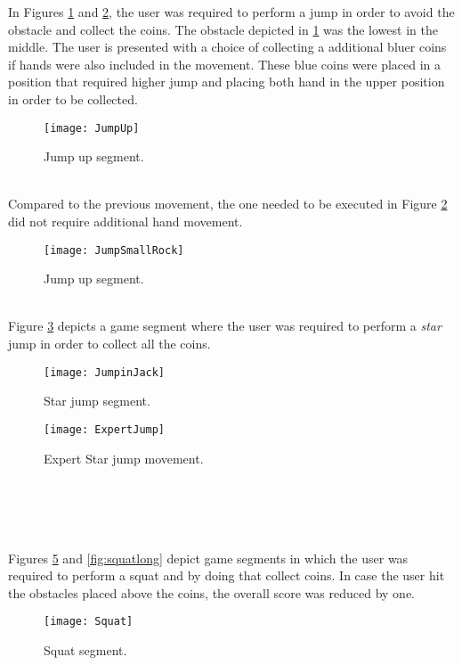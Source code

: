 In Figures \ref{fig:jumpup} and \ref{fig:jumpssmallrock}, the user was required to perform a jump in order to avoid the obstacle and collect the coins. The obstacle depicted  in \ref{fig:jumpup} was the lowest in the middle. The user is presented with a choice of collecting a additional bluer coins if hands were also included in the movement. These blue coins were placed in a position that required higher jump and placing both hand in the upper position in order to be collected.\\
\begin{figure}[h]
    \centering
    \texttt{[image: JumpUp]}
    \caption{Jump up segment.}
    \label{fig:jumpup}
\end{figure}\\
Compared to the previous movement, the one needed to be executed in Figure \ref{fig:jumpssmallrock} did not require additional hand movement.\\
\begin{figure}[h]
    \centering
    \texttt{[image: JumpSmallRock]}
    \caption{Jump up segment.}
    \label{fig:jumpssmallrock}
\end{figure}\\
Figure \ref{fig:star} depicts a game segment where the user was required to perform a \textit{star} jump in order to collect all the coins.\\
\begin{figure}[h]
    \centering
    \texttt{[image: JumpinJack]}
    \caption{Star jump segment.}
    \label{fig:star}
\end{figure}
\begin{figure}[h]
    \centering
    \texttt{[image: ExpertJump]}
    \caption{Expert Star jump movement.}
    \label{fig:expertstarjump}
\end{figure}\\\\\\\\
Figures \ref{fig:squat} and \ref{fig:squatlong} depict game segments in which the user was required to perform a squat and by doing that collect coins. In case the user hit the obstacles placed above the coins, the overall score was reduced by one.\\
\begin{figure}[h]
    \centering
    \texttt{[image: Squat]}
    \caption{Squat segment.}
    \label{fig:squat}
\end{figure}
